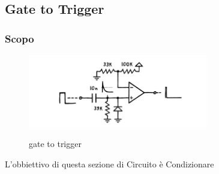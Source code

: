 \documentclass{article}
\begin{document}
\subsection{Gate to Trigger}
\subsubsection{Scopo}

\begin{figure}[H]
    \centering
    \caption{gate to trigger}
    \includegraphics[width=0.7\textwidth]{gatebase.png} 
    \label{fig:gate to trigger}
\end{figure}
L'obbiettivo di questa sezione di Circuito è Condizionare 
\end{document}
